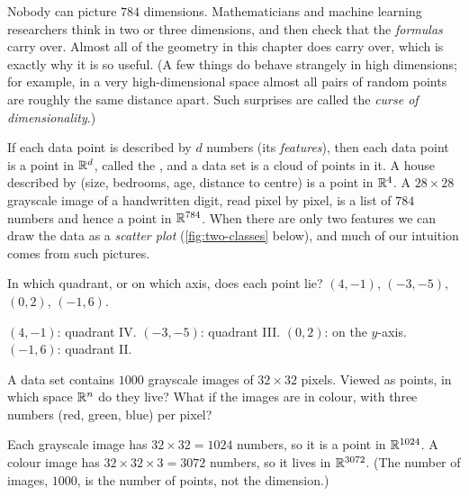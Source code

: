 \begin{intuition}
Nobody can picture $784$ dimensions. Mathematicians and machine learning
researchers think in two or three dimensions, and then check that the
\emph{formulas} carry over. Almost all of the geometry in this chapter does
carry over, which is exactly why it is so useful. (A few things do behave
strangely in high dimensions; for example, in a very high-dimensional space
almost all pairs of random points are roughly the same distance apart. Such
surprises are called the \emph{curse of dimensionality}.)
\end{intuition}

\begin{mlnote}
If each data point is described by $d$ numbers (its \emph{features}), then each
data point is a point in $\mathbb{R}^d$, called the , and a data
set is a cloud of points in it. A house described by (size, bedrooms, age,
distance to centre) is a point in $\mathbb{R}^4$. A $28 \times 28$ grayscale image of a
handwritten digit, read pixel by pixel, is a list of $784$ numbers and hence a
point in $\mathbb{R}^{784}$. When there are only two features we can draw the data as
a \emph{scatter plot} (\cref{fig:two-classes} below), and much of our
intuition comes from such pictures.
\end{mlnote}

\sectionexercises

\begin{exercise}
In which quadrant, or on which axis, does each point lie? $(4, -1)$,
$(-3, -5)$, $(0, 2)$, $(-1, 6)$.
\end{exercise}
\begin{solution}
$(4,-1)$: quadrant IV. $(-3,-5)$: quadrant III. $(0,2)$: on the $y$-axis.
$(-1,6)$: quadrant II.
\end{solution}

\begin{exercise}
A data set contains $1000$ grayscale images of $32\times32$ pixels. Viewed as
points, in which space $\mathbb{R}^n$ do they live? What if the images are in colour,
with three numbers (red, green, blue) per pixel?
\end{exercise}
\begin{solution}
Each grayscale image has $32 \times 32 = 1024$ numbers, so it is a point in
$\mathbb{R}^{1024}$. A colour image has $32 \times 32 \times 3 = 3072$ numbers, so it
lives in $\mathbb{R}^{3072}$. (The number of images, $1000$, is the number of points,
not the dimension.)
\end{solution}

